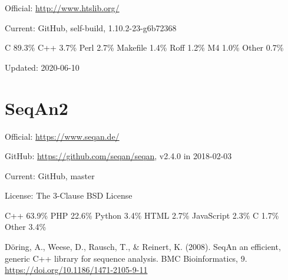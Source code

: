 \documentclass[]{article}
\begin{document}
Official: \url{http://www.htslib.org/}

Current: GitHub, self-build,  1.10.2-23-g6b72368

C 89.3\% C++ 3.7\% Perl 2.7\% Makefile 1.4\% Roff 1.2\% M4 1.0\% Other 0.7\%

Updated: 2020-06-10

\section{SeqAn2}

Official: \url{https://www.seqan.de/}

GitHub: \url{https://github.com/seqan/seqan}, v2.4.0 in 2018-02-03

Current: GitHub, master

License: The 3-Clause BSD License

C++ 63.9\% PHP 22.6\% Python 3.4\% HTML 2.7\% JavaScript 2.3\% C 1.7\% Other 3.4\%

Döring, A., Weese, D., Rausch, T., \& Reinert, K. (2008). SeqAn an efficient, generic C++ library for sequence analysis. BMC Bioinformatics, 9. \url{https://doi.org/10.1186/1471-2105-9-11}
\end{document}
